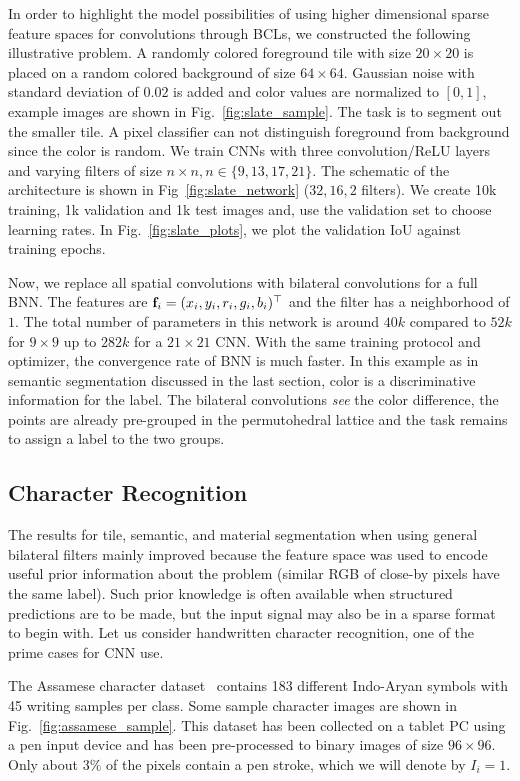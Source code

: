In order to highlight the model possibilities of using higher dimensional sparse feature
spaces for convolutions through BCLs, we constructed the following illustrative problem. A randomly colored
foreground tile with size $20\times 20$ is placed on a random colored background
of size $64 \times 64$. Gaussian noise with standard deviation of $0.02$ is added and color values
are normalized to $[0,1]$, example images
are shown in Fig.~\ref{fig:slate_sample}.
The task is to segment out the smaller tile. A pixel classifier can
not distinguish foreground from background since the color is random. We train CNNs with three
convolution/ReLU layers and varying
filters of size $n \times n, n \in \{9, 13, 17, 21\}$.
The schematic of the architecture is shown
in Fig~\ref{fig:slate_network} ($32,16,2$ filters).
We create 10k training, 1k validation and 1k test images and, use the
validation set to choose learning rates. In
Fig.~\ref{fig:slate_plots}, we plot the validation IoU against training epochs.

Now, we replace all spatial convolutions with bilateral convolutions for a full BNN.
The features are $\mathbf{f}_i=(x_i,y_i,r_i,g_i,b_i)^{\top}$ and the filter has a neighborhood of $1$.
The total number of
parameters in this network is around $40k$ compared to $52k$ for $9\times 9$ up to $282k$ for a $21\times 21$
CNN. With the same training protocol
and optimizer, the convergence rate of BNN is much faster. In this example
as in semantic segmentation discussed in the last section, color is a discriminative information for
the label. The bilateral convolutions \emph{see} the color difference, the points are already
pre-grouped in the permutohedral lattice and the task remains to assign a label to the two groups.

\vspace{-0.4cm}
\subsection{Character Recognition}
The results for tile, semantic, and material segmentation when using general bilateral
filters mainly improved because the feature space was used to encode useful prior information about the
problem (similar RGB of close-by pixels have the same label). Such prior knowledge is often available when
structured predictions are to be made, but the input signal may also be in a sparse format to begin with.
Let us consider handwritten character recognition, one of the prime cases for CNN use.

The Assamese character dataset~\cite{bache2013uci} contains 183 different Indo-Aryan
symbols with 45 writing samples per class. Some sample character images are shown in
Fig.~\ref{fig:assamese_sample}. This dataset has been collected on a tablet PC using a pen
input device and has been pre-processed to binary images of size $96 \times 96$.
Only about $3\%$ of the pixels contain a pen stroke, which we will denote by $I_i=1$.

